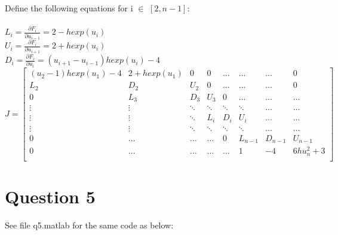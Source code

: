 \documentclass[fleqn]{report}
\begin{document}
Define the following equations for i $\in$ $[2, n-1]$:\\\\
\indent $L_i = \frac{\partial F_i}{\partial u_{i-1}} = 2 - hexp(u_i)$\\ 
\indent $U_i = \frac{\partial F_i}{\partial u_{i+1}} = 2 + hexp(u_i)$\\
\indent $D_i = \frac{\partial F_i}{\partial u_i} =  (u_{i+1} - u_{i-1})hexp(u_i) -4$\\

\[
 J=
\left[ {\begin{array}{cccccccc}
(u_2 - 1)hexp(u_1) - 4 & 2 +hexp(u_1) & 0 & 0 & \hdots & \hdots & \hdots & 0 \\
L_2 & D_2 & U_2 & 0 & \hdots & \hdots & \hdots & 0 \\ 
0 & L_3 & D_3 & U_3 & 0 & \hdots & \hdots & \hdots \\
\vdots & \vdots & \ddots & \ddots & \ddots & \ddots & \hdots & \hdots\\
\vdots & \vdots & \ddots & L_i & D_i  & U_i & \hdots & \hdots \\
\vdots & \vdots & \ddots & \ddots & \ddots & \ddots & \hdots & \hdots \\
0 & \hdots & \hdots & \hdots & 0 & L_{n-1} & D_{n-1} & U_{n-1} \\
0 & \hdots & \hdots & \hdots & \hdots & 1 & -4 & 6hu^2_n + 3\\
  \end{array} } \right]
\]

\newpage
\section{Question 5}
See file q5.matlab for the same code as below:

\end{document}
